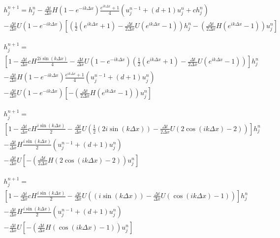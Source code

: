 \documentclass[12pt]{article}
\begin{document}
\begin{multline}
h^{n+1}_{j} = h^n_j - \frac{\Delta t}{\Delta x}H(1 -e^{-ik\Delta x} )\frac{e^{ik\Delta x} +1}{4}\left(u^{n-1}_j   +(d+1)u^n_j   +c h^n_j\right) \\  - \frac{\Delta t}{\Delta x}U(1 -e^{-ik\Delta x} )\left[\left(\frac{1}{2}\left(e^{ik\Delta x} + 1\right) - \frac{\Delta t}{2\Delta x}U\left(e^{ik\Delta x} - 1\right)\right)h^n_j   - \left(\frac{\Delta t}{2\Delta x}H\left(e^{ik\Delta x} - 1\right)\right)u^n_j\right]
\end{multline}

\begin{multline}
h^{n+1}_{j} = \\\left[1 - \frac{\Delta t}{\Delta x}cH\frac{2i\sin\left(k\Delta x\right)}{4} - \frac{\Delta t}{\Delta x}U(1 -e^{-ik\Delta x} )\left(\frac{1}{2}\left(e^{ik\Delta x} + 1\right) - \frac{\Delta t}{2\Delta x}U\left(e^{ik\Delta x} - 1\right)\right) \right]h^n_j \\ - \frac{\Delta t}{\Delta x}H(1 -e^{-ik\Delta x} )\frac{e^{ik\Delta x} +1}{4}\left(u^{n-1}_j   +(d+1)u^n_j \right) \\  - \frac{\Delta t}{\Delta x}U(1 -e^{-ik\Delta x} )\left[ - \left(\frac{\Delta t}{2\Delta x}H\left(e^{ik\Delta x} - 1\right)\right)u^n_j\right]
\end{multline}

\begin{multline}
h^{n+1}_{j} = \\\left[1 - \frac{\Delta t}{\Delta x}cH\frac{i\sin\left(k\Delta x\right)}{2} - \frac{\Delta t}{\Delta x}U\left(\frac{1}{2}\left(2i\sin\left(k\Delta x\right)\right) - \frac{\Delta t}{2\Delta x}U\left(2\cos\left(ik\Delta x\right) - 2\right)\right) \right]h^n_j \\ - \frac{\Delta t}{\Delta x}H\frac{i\sin\left(k\Delta x\right)}{2}\left(u^{n-1}_j   +(d+1)u^n_j \right) \\  - \frac{\Delta t}{\Delta x}U\left[ - \left(\frac{\Delta t}{2\Delta x}H\left(2\cos\left(ik\Delta x\right) - 2\right)\right)u^n_j\right]
\end{multline}

\begin{multline}
h^{n+1}_{j} = \\\left[1 - \frac{\Delta t}{\Delta x}cH\frac{i\sin\left(k\Delta x\right)}{2} - \frac{\Delta t}{\Delta x}U\left(\left(i\sin\left(k\Delta x\right)\right) - \frac{\Delta t}{\Delta x}U\left(\cos\left(ik\Delta x\right) - 1\right)\right) \right]h^n_j \\ - \frac{\Delta t}{\Delta x}H\frac{i\sin\left(k\Delta x\right)}{2}\left(u^{n-1}_j   +(d+1)u^n_j \right) \\  - \frac{\Delta t}{\Delta x}U\left[ - \left(\frac{\Delta t}{\Delta x}H\left(\cos\left(ik\Delta x\right) - 1\right)\right)u^n_j\right]
\end{multline}
\end{document}
